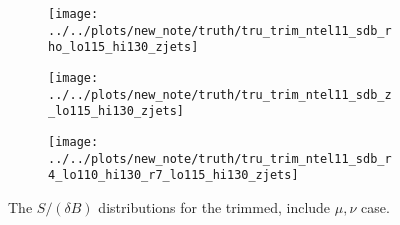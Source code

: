 \begin{figure}[!htbp]\captionsetup{justification=centering}
\begin{center}
\begin{subfigure}[t]{18pc}\centering\texttt{[image: ../../plots/new\_note/truth/tru\_trim\_ntel11\_sdb\_rho\_lo115\_hi130\_zjets]}\caption{}\end{subfigure}
\begin{subfigure}[t]{18pc}\centering\texttt{[image: ../../plots/new\_note/truth/tru\_trim\_ntel11\_sdb\_z\_lo115\_hi130\_zjets]}\caption{}\end{subfigure}
\begin{subfigure}[t]{18pc}\centering\texttt{[image: ../../plots/new\_note/truth/tru\_trim\_ntel11\_sdb\_r4\_lo110\_hi130\_r7\_lo115\_hi130\_zjets]}\caption{}\end{subfigure}
\caption{\label{fig:mbbtrim}The $S/(\delta B)$ distributions for the trimmed, include $\mu,\nu$ case.}
\end{center}
\end{figure}

